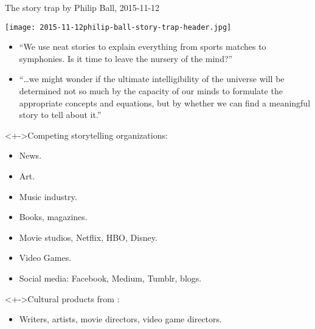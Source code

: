 \begin{frame}
  \footnotesize
  
  \begin{block}{
      {The story trap} 
      by Philip Ball, 2015-11-12}

    \begin{center}
      \texttt{[image: 2015-11-12philip-ball-story-trap-header.jpg]}
    \end{center}

    \begin{itemize}
    \item
      ``We use neat stories to explain everything from sports matches
      to symphonies. Is it time to leave the nursery of the mind?''
    \item
      ``\ldots we might wonder if the ultimate intelligibility of the
      universe will be determined not so much by the capacity of our minds
      to formulate the appropriate concepts and equations, but by whether we
      can find a meaningful story to tell about it.''
    \end{itemize}

  \end{block}

\end{frame}

\begin{frame}

  \begin{block}<+->{Competing storytelling organizations:}
    \begin{itemize}
    \item 
      News.
    \item 
      Art.
    \item 
      Music industry.
    \item 
      Books, magazines.
    \item 
      Movie studios, Netflix, HBO, Disney.
    \item 
      Video Games.
    \item 
      Social media: Facebook, Medium, Tumblr, blogs.
    \end{itemize}
  \end{block}

  \begin{block}<+->{Cultural products from :}
    \begin{itemize}
    \item 
      Writers, artists, movie directors, video game directors.
    \end{itemize}
  \end{block}
  
\end{frame}

